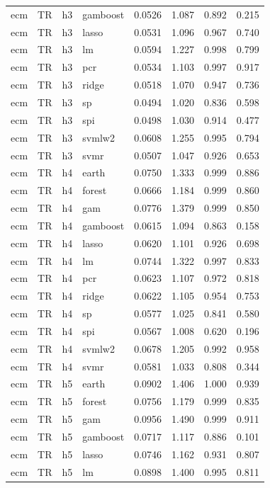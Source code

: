 \begin{ThreePartTable}
\begin{longtable}[t]{llclcccc}
ecm & TR & h3 & gamboost & 0.0526 & 1.087 & 0.892 & 0.215\\
ecm & TR & h3 & lasso & 0.0531 & 1.096 & 0.967 & 0.740\\
ecm & TR & h3 & lm & 0.0594 & 1.227 & 0.998 & 0.799\\
ecm & TR & h3 & pcr & 0.0534 & 1.103 & 0.997 & 0.917\\
ecm & TR & h3 & ridge & 0.0518 & 1.070 & 0.947 & 0.736\\
ecm & TR & h3 & sp & 0.0494 & 1.020 & 0.836 & 0.598\\
ecm & TR & h3 & spi & 0.0498 & 1.030 & 0.914 & 0.477\\
ecm & TR & h3 & svmlw2 & 0.0608 & 1.255 & 0.995 & 0.794\\
ecm & TR & h3 & svmr & 0.0507 & 1.047 & 0.926 & 0.653\\
\addlinespace
ecm & TR & h4 & earth & 0.0750 & 1.333 & 0.999 & 0.886\\
ecm & TR & h4 & forest & 0.0666 & 1.184 & 0.999 & 0.860\\
ecm & TR & h4 & gam & 0.0776 & 1.379 & 0.999 & 0.850\\
ecm & TR & h4 & gamboost & 0.0615 & 1.094 & 0.863 & 0.158\\
ecm & TR & h4 & lasso & 0.0620 & 1.101 & 0.926 & 0.698\\
ecm & TR & h4 & lm & 0.0744 & 1.322 & 0.997 & 0.833\\
ecm & TR & h4 & pcr & 0.0623 & 1.107 & 0.972 & 0.818\\
ecm & TR & h4 & ridge & 0.0622 & 1.105 & 0.954 & 0.753\\
ecm & TR & h4 & sp & 0.0577 & 1.025 & 0.841 & 0.580\\
ecm & TR & h4 & spi & 0.0567 & 1.008 & 0.620 & 0.196\\
ecm & TR & h4 & svmlw2 & 0.0678 & 1.205 & 0.992 & 0.958\\
ecm & TR & h4 & svmr & 0.0581 & 1.033 & 0.808 & 0.344\\
\addlinespace
ecm & TR & h5 & earth & 0.0902 & 1.406 & 1.000 & 0.939\\
ecm & TR & h5 & forest & 0.0756 & 1.179 & 0.999 & 0.835\\
ecm & TR & h5 & gam & 0.0956 & 1.490 & 0.999 & 0.911\\
ecm & TR & h5 & gamboost & 0.0717 & 1.117 & 0.886 & 0.101\\
ecm & TR & h5 & lasso & 0.0746 & 1.162 & 0.931 & 0.807\\
ecm & TR & h5 & lm & 0.0898 & 1.400 & 0.995 & 0.811\\

\end{longtable}
\end{ThreePartTable}
